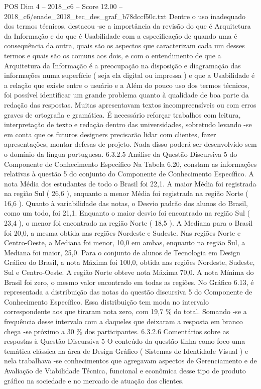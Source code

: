 \begin{textsample}{POS Dim 4 – 2018\_c6 – Score 12.00 – 2018\_c6/enade\_2018\_tec\_des\_graf\_b78dccf50c.txt}
Dentre o uso inadequado dos termos técnicos, destacou -se a importância da revisão do que é Arquitetura da Informação e do que é Usabilidade com a especificação de quando uma é consequência da outra, quais são os aspectos que caracterizam cada um desses termos e quais são os comuns aos dois, e com o entendimento de que a Arquitetura da Informação é a preocupação na disposição e diagramação das informações numa superfície ( seja ela digital ou impressa ) e que a Usabilidade é a relação que existe entre o usuário e a Além do pouco uso dos termos técnicos, foi possível identificar um grande problema quanto à qualidade de boa parte da redação das respostas.
Muitas apresentavam textos incompreensíveis ou com erros graves de ortografia e gramática.
É necessário reforçar trabalhos com leitura, interpretação de texto e redação dentro das universidades, sobretudo levando -se em conta que os futuros designers precisarão lidar com clientes, fazer apresentações, montar defesas de projeto.
Nada disso poderá ser desenvolvido sem o domínio da língua portuguesa. 6.3.2.5 Análise da Questão Discursiva 5 do Componente de Conhecimento Específico Na Tabela 6.20, constam as informações relativas à questão 5 do conjunto do Componente de Conhecimento Específico.
A nota Média dos estudantes de todo o Brasil foi 22,1.
A maior Média foi registrada na região Sul ( 26,6 ), enquanto a menor Média foi registrada na região Norte ( 16,6 ).
Quanto à variabilidade das notas, o Desvio padrão dos alunos do Brasil, como um todo, foi 21,1.
Enquanto o maior desvio foi encontrado na região Sul ( 23,4 ), o menor foi encontrado na região Norte ( 18,5 ).
A Mediana para o Brasil foi 20,0, a mesma obtida nas regiões Nordeste e Sudeste.
Nas regiões Norte e Centro-Oeste, a Mediana foi menor, 10,0 em ambas, enquanto na região Sul, a Mediana foi maior, 25,0.
Para o conjunto de alunos de Tecnologia em Design Gráfico do Brasil, a nota Máxima foi 100,0, obtida nas regiões Nordeste, Sudeste, Sul e Centro-Oeste.
A região Norte obteve nota Máxima 70,0.
A nota Mínima do Brasil foi zero, o mesmo valor encontrado em todas as regiões.
No Gráfico 6.13, é representada a distribuição das notas da questão discursiva 5 do Componente de Conhecimento Específico.
Essa distribuição tem moda no intervalo correspondente aos que tiraram nota zero, com 19,7 \% do total.
Somando -se a frequência desse intervalo com a daqueles que deixaram a resposta em branco chega -se próximo a 30 \% dos participantes. 6.3.2.6 Comentários sobre as respostas à Questão Discursiva 5 O conteúdo da questão tinha como foco uma temática clássica na área de Design Gráfico ( Sistemas de Identidade Visual ) e nela trabalhava -se conhecimentos que agregavam aspectos de Gerenciamento e de Avaliação de Viabilidade Técnica, funcional e econômica desse tipo de produto gráfico na sociedade e no mercado de atuação dos clientes.

\end{textsample}
